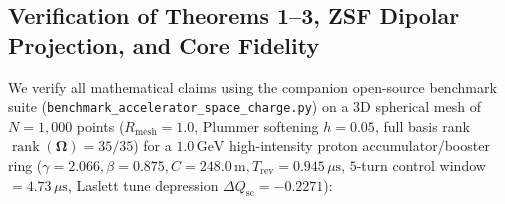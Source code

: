 \documentclass[11pt,a4paper]{article}
\newcommand{\bOmega}{\mathbf{\Omega}}
\begin{document}
\subsection{Verification of Theorems 1--3, ZSF Dipolar Projection, and Core Fidelity}
\label{sec:verification_theorems}
We verify all mathematical claims using the companion open-source benchmark suite (\texttt{benchmark\_\allowbreak accelerator\_\allowbreak space\_\allowbreak charge.py}) on a 3D spherical mesh of $N = 1,000$ points ($R_{\mathrm{mesh}} = 1.0$, Plummer softening $h = 0.05$, full basis rank $\operatorname{rank}(\bOmega) = 35/35$) for a $1.0\,\mathrm{GeV}$ high-intensity proton accumulator/booster ring ($\gamma = 2.066, \beta = 0.875, C = 248.0\,\mathrm{m}, T_{\mathrm{rev}} = 0.945\,\mu\mathrm{s}$, $5$-turn control window $= 4.73\,\mu\mathrm{s}$, Laslett tune depression $\Delta Q_{\mathrm{sc}} = -0.2271$):
\end{document}
